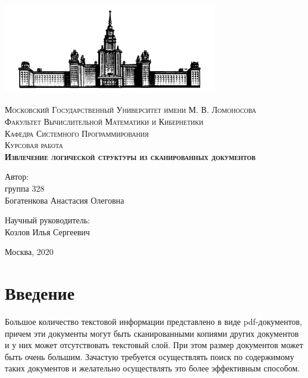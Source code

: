 \documentclass[a4paper,12pt]{article}
\begin{document}
\begin{titlepage}
\begin{center}

\includegraphics[width=0.7\textwidth]{pics/logo.png}

\textsc{\normalsize Московский Государственный Университет имени М. В. Ломоносова}\\
\textsc{\small Факультет Вычислительной Математики и Кибернетики}\\
\textsc{\small Кафедра Системного Программирования}\\[1.5cm]

\textsc{\Large Курсовая работа }\\[0.5cm]
\textsc{ \bf \Large  Извлечение логической структуры из сканированных документов }\\[1.2cm]

\vspace{3cm}
\begin{flushright}
Автор: \\
группа 328 \\
Богатенкова Анастасия Олеговна
\end{flushright}
\begin{flushright}
Научный руководитель: \\
Козлов Илья Сергеевич
\end{flushright}

\vspace{3cm}
{ Москва, 2020}\\[0.2cm]

\vfill

\end{center}
\end{titlepage}

\tableofcontents

\newpage 
\section{Введение}

Большое количество текстовой информации представлено в виде pdf-документов, причем эти документы могут быть сканированными копиями других документов и у них может отсутствовать текстовый слой. При этом размер документов может быть очень большим. Зачастую требуется осуществлять поиск по содержимому таких документов и желательно осуществлять это более эффективным способом.
\end{document}

